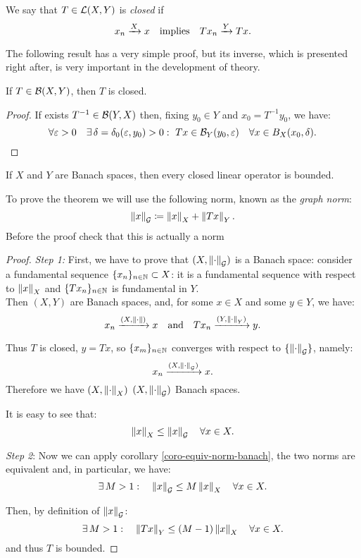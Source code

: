 \begin{defn}
	We say that $T \in \mathcal L(X,Y)$ is \emph{closed} if 
	$$
		x_n \xrightarrow{X} x 
		\quad \text{implies} \quad 
		T x_n \xrightarrow{Y} Tx
	.
	$$
\end{defn}

The following result has a very simple proof, but its inverse, which is presented right after, is very important in the development of theory.
\begin{prop}
	If $T \in \mathcal B (X,Y)$, then $T$ is closed.
\end{prop}

\begin{proof}
	If exists $T^{-1} \in \mathcal B(Y,X)$ then, fixing $y_0 \in Y$ and $x_0 = T^{-1}y_0$, we have:
	$$
		\forall \varepsilon > 0 
		\quad \exists \, \delta = \delta_0(\varepsilon, y_0) > 0 : 
		\  Tx \in \mathcal B_Y(y_0, \varepsilon) 
		\quad \forall x \in B_X(x_0,\delta)
	.
	$$
\end{proof}

\begin{theo}
	If $X$ and $Y$ are Banach spaces, then every closed linear operator is bounded.
\end{theo}

To prove the theorem we will use the following norm, known as the \emph{graph norm}:
$$
	\left\lVert x\right\rVert_{\mathcal G} 
	\coloneqq \left\lVert x\right\rVert_X+\left\lVert Tx\right\rVert_Y
.
$$
Before the proof check that this is actually a norm

\begin{proof} 
	\textit{Step 1:} First, we have to prove that $(X,\left\lVert\cdot\right\rVert_{\mathcal G})$ is a Banach space: consider a fundamental sequence $\{x_n\}_{n\in\mathbb N} \subset X$: it is a fundamental sequence with respect to $\left\lVert x\right\rVert_X$ and $\{Tx_n\}_{n\in \mathbb N}$ is fundamental in $Y$.\\
	Then $(X,Y)$ are Banach spaces, and, for some $x \in X$ and some $y \in Y$, we have:
	$$
		x_n \xrightarrow{(X,\left\lVert\cdot\right\rVert)} x 
		\quad \text{and} \quad 
		Tx_n \xrightarrow{(Y,\left\lVert\cdot\right\rVert_Y)} y
	.
	$$
	
	Thus $T$ is closed, $y=Tx$, so $\{x_m\}_{n \in \mathbb N}$ converges with respect to $\{\left\lVert\cdot\right\rVert_{\mathcal G}\}$, namely: 
	$$
		x_n \xrightarrow{(X,\left\lVert\cdot\right\rVert_{\mathcal G})} x
	.
	$$
	Therefore we have $(X,\left\lVert\cdot\right\rVert_X)$ $(X,\left\lVert\cdot\right\rVert_{\mathcal G})$ Banach spaces.
	
	It is easy to see that:	$$\left\lVert x\right\rVert_X \leq \left\lVert x\right\rVert_{\mathcal G} \quad \forall x \in X.$$
	
	\textit{Step 2}: Now we can apply corollary \vref{coro-equiv-norm-banach},  the two norms are equivalent and, in particular, we have:
	$$
		\exists \, M > 1 : 
		\quad \left\lVert x\right\rVert_{\mathcal G} 
		\leq M \left\lVert x\right\rVert_X 
		\quad \forall x \in X
	.
	$$
	
	Then, by definition of $\left\lVert x\right\rVert_{\mathcal G}$:
	$$
		\exists \, M > 1 : 
		\quad \left\lVert Tx\right\rVert_Y \leq (M - 1) \left\lVert x\right\rVert_X 
		\quad \forall x \in X
	.
	$$
	and thus $T$ is bounded.
\end{proof}

